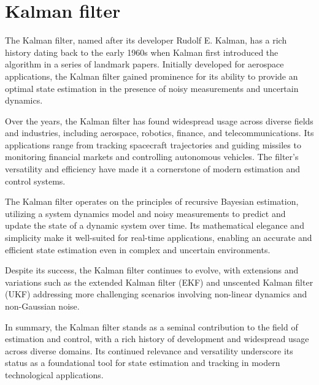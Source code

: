 \section{Kalman filter}
    \label{sec:Kalman}
The Kalman filter, named after its developer Rudolf E. Kalman, has a rich history dating back to the early 1960s when Kalman first introduced the algorithm in a series of landmark papers. Initially developed for aerospace applications, the Kalman filter gained prominence for its ability to provide an optimal state estimation in the presence of noisy measurements and uncertain dynamics.

Over the years, the Kalman filter has found widespread usage across diverse fields and industries, including aerospace, robotics, finance, and telecommunications. Its applications range from tracking spacecraft trajectories and guiding missiles to monitoring financial markets and controlling autonomous vehicles. The filter's versatility and efficiency have made it a cornerstone of modern estimation and control systems.

The Kalman filter operates on the principles of recursive Bayesian estimation, utilizing a system dynamics model and noisy measurements to predict and update the state of a dynamic system over time. Its mathematical elegance and simplicity make it well-suited for real-time applications, enabling an accurate and efficient state estimation even in complex and uncertain environments.

Despite its success, the Kalman filter continues to evolve, with extensions and variations such as the
extended Kalman filter (EKF) \cite{EKF} and unscented Kalman filter (UKF) \cite{UKF} addressing
more
challenging
scenarios involving non-linear dynamics and non-Gaussian noise.

In summary, the Kalman filter stands as a seminal contribution to the field of estimation and control, with a rich history of development and widespread usage across diverse domains. Its continued relevance and versatility underscore its status as a foundational tool for state estimation and tracking in modern technological applications.

